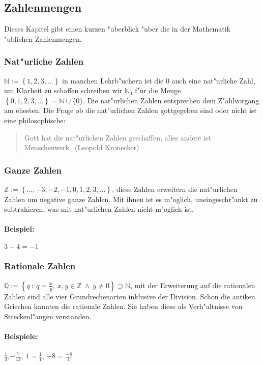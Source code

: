 \subsection{Zahlenmengen}
Dieses Kapitel gibt einen kurzen "uberblick "uber die in der Mathematik "ublichen Zahlenmengen.

\subsubsection{Nat"urliche Zahlen}
$\mathbb{N} := \left\{1, 2, 3, \ldots \right\}$ in manchen Lehrb"uchern ist die $0$ auch eine nat"urliche Zahl, um Klarheit zu schaffen schreiben wir $\mathbb{N}_0$ f"ur die Menge $\left\{0, 1, 2, 3, \ldots \right\} = \mathbb{N} \cup \{0\}$. Die nat"urlichen Zahlen entsprechen dem Z"ahlvorgang am ehesten. Die Frage ob die nat"urlichen Zahlen gottgegeben sind oder nicht ist eine philosophische:
\begin{quote}
\glqq Gott hat die nat"urlichen Zahlen geschaffen, alles andere ist Menschenwerk.\grqq \ (Leopold Kronecker)
\end{quote}

\subsubsection{Ganze Zahlen}
$\mathbb{Z} := \left\{\ldots, -3, -2, -1, 0, 1, 2, 3, \ldots \right\}$, diese Zahlen erweitern die nat"urlichen Zahlen um negative ganze Zahlen. Mit ihnen ist es m"oglich, uneingeschr"ankt zu subtrahieren, was mit nat"urlichen Zahlen nicht m"oglich ist.
\paragraph{Beispiel: } $3 - 4 = -1$

\subsubsection{Rationale Zahlen}
$\mathbb{Q} := \left\{ q \  : \ q = \frac{x}{y}, \ x,y \in \mathbb{Z} \  \land \ y \neq 0 \right\} \supset \mathbb{N}$, mit der Erweiterung auf die rationalen Zahlen sind alle vier Grundrechenarten inklusive der Division. Schon die antiken Griechen kannten die rationale Zahlen. Sie haben diese als Verh"altnisse von Streckenl"angen verstanden.

\paragraph{Beispiele: } $\frac{1}{3}$,$-\frac{7}{13}$, $1 = \frac{1}{1}$, $-8 =\frac{-8}{1}$

